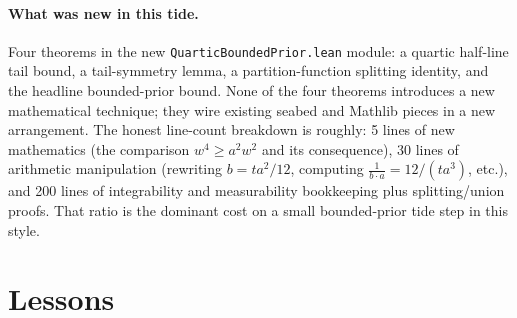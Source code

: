 \documentclass[11pt]{article}
\begin{document}
\paragraph{What was new in this tide.}
Four theorems in the new \texttt{QuarticBoundedPrior.lean} module:
a quartic half-line tail bound, a tail-symmetry lemma, a
partition-function splitting identity, and the headline bounded-prior
bound. None of the four theorems
introduces a new mathematical technique; they wire existing seabed and
Mathlib pieces in a new arrangement. The honest line-count breakdown is
roughly: 5 lines of new mathematics (the comparison
$w^4 \ge a^2 w^2$ and its consequence), 30 lines of arithmetic
manipulation (rewriting $b = t a^2/12$, computing
$\frac{1}{b \cdot a} = 12/(t a^3)$, etc.), and 200 lines of integrability
and measurability bookkeeping plus splitting/union proofs. That ratio
is the dominant cost on a small bounded-prior tide step in this style.

\section{Lessons}
\end{document}
